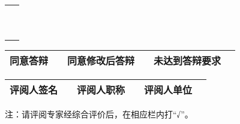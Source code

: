 \begin{center}
\begin{adjustbox}{minipage=16.83cm, center}
\begin{tabularx}{\textwidth}{|X|}
    ~\\
    ~\\
    \hline
  \end{tabularx}
  \begin{tabularx}{\textwidth}{|p{2cm}|X|p{3cm}|X|p{3cm}|X|}
    同意答辩    &  & 同意修改后答辩 &  & 未达到答辩要求 &        \\ \hline
  \end{tabularx}
  \begin{tabularx}{\textwidth}{|p{2.2cm}|X|p{2.2cm}|X|p{2.2cm}|X|}
    评阅人签名  &   & 评阅人职称     &  & 评阅人单位    &      \\ \hline
  \end{tabularx}
\end{adjustbox}
\end{center}

\vfill

\songti{}注：请评阅专家经综合评价后，在相应栏内打“√”。
